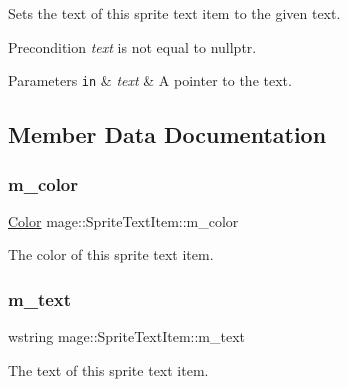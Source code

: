 Sets the text of this sprite text item to the given text.

\begin{DoxyPrecond}{Precondition}
{\itshape text} is not equal to {\ttfamily nullptr}. 
\end{DoxyPrecond}

\begin{DoxyParams}[1]{Parameters}
\mbox{\tt in}  & {\em text} & A pointer to the text. \\
\hline
\end{DoxyParams}


\subsection{Member Data Documentation}
\hypertarget{structmage_1_1_sprite_text_item_a47e7057c6de9f22492b09be6c6f3a932}{}\label{structmage_1_1_sprite_text_item_a47e7057c6de9f22492b09be6c6f3a932} 
\subsubsection{\texorpdfstring{m\+\_\+color}{m\_color}}
{\footnotesize\ttfamily \hyperlink{structmage_1_1_color}{Color} mage\+::\+Sprite\+Text\+Item\+::m\+\_\+color\hspace{0.3cm}{\ttfamily [private]}}

The color of this sprite text item. \hypertarget{structmage_1_1_sprite_text_item_a027472334af3f1095931d238ea42cd6c}{}\label{structmage_1_1_sprite_text_item_a027472334af3f1095931d238ea42cd6c} 
\subsubsection{\texorpdfstring{m\+\_\+text}{m\_text}}
{\footnotesize\ttfamily wstring mage\+::\+Sprite\+Text\+Item\+::m\+\_\+text\hspace{0.3cm}{\ttfamily [private]}}

The text of this sprite text item. 